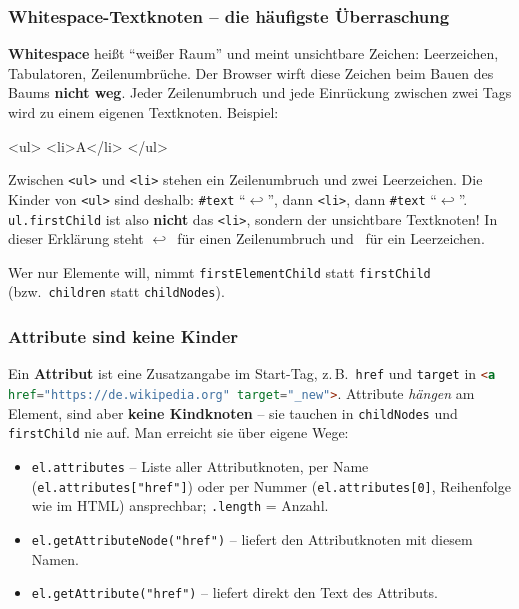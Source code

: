 \documentclass[a4paper,11pt]{article}
\newcommand{\nl}{\ensuremath{\hookleftarrow}}
\newcommand{\ws}{\textvisiblespace}
\begin{document}
\subsubsection*{Whitespace-Textknoten -- die häufigste Überraschung}

\textbf{Whitespace} heißt "`weißer Raum"' und meint unsichtbare Zeichen: Leerzeichen, Tabulatoren, Zeilenumbrüche.
Der Browser wirft diese Zeichen beim Bauen des Baums \textbf{nicht weg}. Jeder Zeilenumbruch und jede Einrückung
zwischen zwei Tags wird zu einem eigenen Textknoten. Beispiel:
\begin{htmlcode}
<ul>
  <li>A</li>
</ul>
\end{htmlcode}
Zwischen \texttt{<ul>} und \texttt{<li>} stehen ein Zeilenumbruch und zwei Leerzeichen. Die Kinder von
\texttt{<ul>} sind deshalb: \texttt{\#text} "`\nl\ws\ws"', dann \texttt{<li>}, dann \texttt{\#text} "`\nl"'.
\texttt{ul.firstChild} ist also \textbf{nicht} das \texttt{<li>}, sondern der unsichtbare Textknoten!
In dieser Erklärung steht \nl\ für einen Zeilenumbruch und \ws\ für ein Leerzeichen.

Wer nur Elemente will, nimmt \texttt{firstElementChild} statt \texttt{firstChild} (bzw.\ \texttt{children}
statt \texttt{childNodes}).

\subsubsection*{Attribute sind keine Kinder}

Ein \textbf{Attribut} ist eine Zusatzangabe im Start-Tag, z.\,B.\ \texttt{href} und \texttt{target} in
\lstinline[language=HTML]|<a href="https://de.wikipedia.org" target="_new">|. Attribute \emph{hängen} am Element,
sind aber \textbf{keine Kindknoten} -- sie tauchen in \texttt{childNodes} und \texttt{firstChild} nie auf.
Man erreicht sie über eigene Wege:
\begin{itemize}[nosep]
\item \lstinline|el.attributes| -- Liste aller Attributknoten, per Name (\lstinline|el.attributes["href"]|) oder per
      Nummer (\lstinline|el.attributes[0]|, Reihenfolge wie im HTML) ansprechbar; \lstinline|.length| = Anzahl.
\item \lstinline|el.getAttributeNode("href")| -- liefert den Attributknoten mit diesem Namen.
\item \lstinline|el.getAttribute("href")| -- liefert direkt den Text des Attributs.
\end{itemize}
\end{document}
